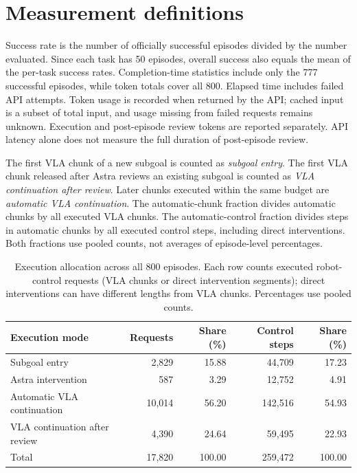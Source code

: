 \section{Measurement definitions}
\label{app:measurements}
Success rate is the number of officially successful episodes divided by the number evaluated. Since each task has 50 episodes, overall success also equals the mean of the per-task success rates. Completion-time statistics include only the 777 successful episodes, while token totals cover all 800. Elapsed time includes failed API attempts. Token usage is recorded when returned by the API; cached input is a subset of total input, and usage missing from failed requests remains unknown. Execution and post-episode review tokens are reported separately. API latency alone does not measure the full duration of post-episode review.

The first VLA chunk of a new subgoal is counted as \emph{subgoal entry}. The first VLA chunk released after Astra reviews an existing subgoal is counted as \emph{VLA continuation after review}. Later chunks executed within the same budget are \emph{automatic VLA continuation}. The automatic-chunk fraction divides automatic chunks by all executed VLA chunks. The automatic-control fraction divides steps in automatic chunks by all executed control steps, including direct interventions. Both fractions use pooled counts, not averages of episode-level percentages.

\begin{table}[!htbp]
\centering
\caption{Execution allocation across all 800 episodes. Each row counts executed robot-control requests (VLA chunks or direct intervention segments); direct interventions can have different lengths from VLA chunks. Percentages use pooled counts.}
\label{tab:allocation-detail}
\small
\begin{tabularx}{\linewidth}{@{}Xrrrr@{}}
\toprule
Execution mode & Requests & Share (\%) & Control steps & Share (\%) \\
\midrule
Subgoal entry & 2,829 & 15.88 & 44,709 & 17.23 \\
Astra intervention & 587 & 3.29 & 12,752 & 4.91 \\
Automatic VLA continuation & 10,014 & 56.20 & 142,516 & 54.93 \\
VLA continuation after review & 4,390 & 24.64 & 59,495 & 22.93 \\
\midrule
Total & 17,820 & 100.00 & 259,472 & 100.00 \\
\bottomrule
\end{tabularx}
\end{table}

